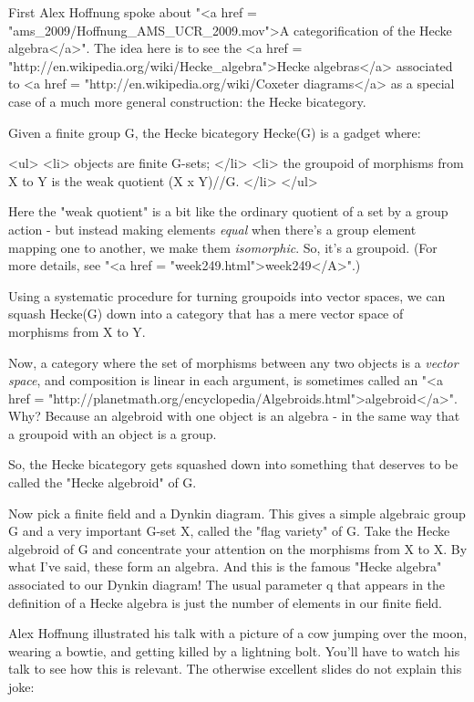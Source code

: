 First Alex Hoffnung spoke about "<a href =
"ams_2009/Hoffnung_AMS_UCR_2009.mov">A categorification of the Hecke
algebra</a>".  The idea here is to see the <a href =
"http://en.wikipedia.org/wiki/Hecke_algebra">Hecke algebras</a>
associated to <a href =
"http://en.wikipedia.org/wiki/Coxeter%
diagrams</a> as a special case of a much more general construction:
the Hecke bicategory.

Given a finite group G, the Hecke bicategory Hecke(G) is a gadget
where:

<ul>
<li>
 objects are finite G-sets;
</li>
<li>
 the groupoid of morphisms from X to Y is the weak quotient (X x Y)//G.
</li>
</ul>

Here the "weak quotient" is a bit like the ordinary quotient
of a set by a group action - but instead making elements \emph{equal}
when there's a group element mapping one to another, we make them
\emph{isomorphic}.  So, it's a groupoid.  (For more details, see
"<a href = "week249.html">week249</A>".)

Using a systematic procedure for turning groupoids into vector spaces,
we can squash Hecke(G) down into a category that has a mere vector
space of morphisms from X to Y.  

Now, a category where the set of morphisms between any two objects is
a \emph{vector space}, and composition is linear in each argument, is
sometimes called an "<a href =
"http://planetmath.org/encyclopedia/Algebroids.html">algebroid</a>".
Why?  Because an algebroid with one object is an algebra - in the same
way that a groupoid with an object is a group.

So, the Hecke bicategory gets squashed down into something that
deserves to be called the "Hecke algebroid" of G.

Now pick a finite field and a Dynkin diagram.  This gives a simple
algebraic group G and a very important G-set X, called the "flag
variety" of G.  Take the Hecke algebroid of G and concentrate
your attention on the morphisms from X to X.  By what I've said, these
form an algebra.  And this is the famous "Hecke algebra"
associated to our Dynkin diagram!  The usual parameter q that appears
in the definition of a Hecke algebra is just the number of elements in
our finite field.

Alex Hoffnung illustrated his talk with a picture of a cow jumping over
the moon, wearing a bowtie, and getting killed by a lightning bolt. 
You'll have to watch his talk to see how this is relevant.  The
otherwise excellent slides do not explain this joke:

